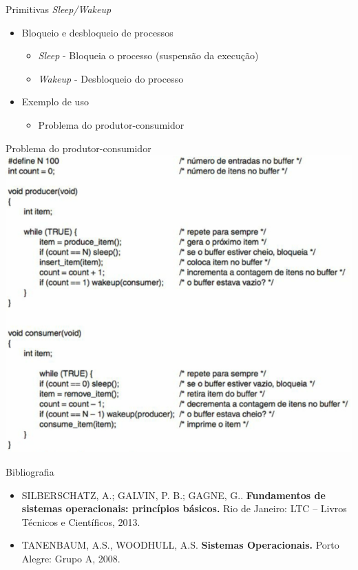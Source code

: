 \documentclass[aspectratio=169,
				xcolor=table]{beamer}
\begin{document}
	\begin{frame}{Primitivas \textit{Sleep/Wakeup}}
		\begin{itemize}
			\item Bloqueio e desbloqueio de processos
			\begin{itemize}
				\item \textit{Sleep} - Bloqueia o processo (suspensão da execução)
				\item \textit{Wakeup} - Desbloqueio do processo
			\end{itemize}
			\vspace{1em}
			\item Exemplo de uso
			\begin{itemize}
				\item Problema do produtor-consumidor
			\end{itemize}
		\end{itemize}
	\end{frame}
	
	\begin{frame}{Problema do produtor-consumidor}
		\includegraphics[keepaspectratio, height=0.8\paperheight]{../figs/cap05/produtorconsumidor.png}
	\end{frame}
	
	\begin{frame}{Bibliografia}
		\begin{itemize}
			\item SILBERSCHATZ, A.; GALVIN, P. B.; GAGNE, G.. \textbf{Fundamentos de sistemas operacionais: princípios básicos.} Rio de Janeiro: LTC – Livros Técnicos e Científicos, 2013.
			
			\vspace{1em}

			\item TANENBAUM, A.S., WOODHULL, A.S. \textbf{Sistemas Operacionais.} Porto Alegre: Grupo A, 2008.
			
		\end{itemize}
	\end{frame}


	\begin{frame}{}
	\end{frame}	
	
\end{document}
